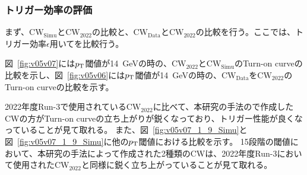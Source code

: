 \subsubsection{トリガー効率の評価}
まず、$\mathrm{CW_{Simu}}$と$\mathrm{CW_{2022}}$の比較と、$\mathrm{CW_{Data}}$と$\mathrm{CW_{2022}}$の比較を行う。ここでは、トリガー効率$\epsilon$用いてを比較行う。

図~\ref{fig:v05v07}には$p_{\rm{T}}$閾値が14~GeVの時の、$\mathrm{CW_{2022}}$と$\mathrm{CW_{Simu}}$のTurn-on curveの比較を示し、図~\ref{fig:v05v06}には$p_{\rm{T}}$閾値が14~GeVの時の、$\mathrm{CW_{Data}}$を$\mathrm{CW_{2022}}$のTurn-on curveの比較を示す。

2022年度Run-3で使用されている$\mathrm{CW_{2022}}$に比べて、本研究の手法ので作成したCWの方がTurn-on curveの立ち上がりが鋭くなっており、トリガー性能が良くなっていることが見て取れる。
また、図~\ref{fig:v05v07_1_9_Simu}と図~\ref{fig:v05v07_1_9_Simu}に他の$p_{\rm{T}}$閾値における比較を示す。
15段階の閾値において、本研究の手法によって作成された2種類のCWは、2022年度Run-3において使用された$\mathrm{CW_{2022}}$と同様に鋭く立ち上がっていることが見て取れる。

